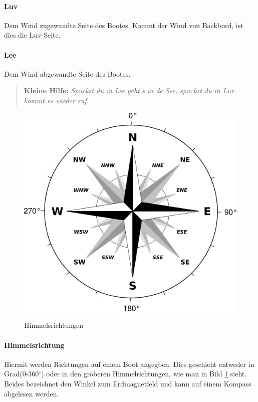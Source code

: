 \documentclass[12pt]{article}
\begin{document}
\paragraph{Luv}
Dem Wind zugewandte Seite des Bootes. Kommt der Wind von Backbord, ist dies die Luv-Seite.

\paragraph{Lee}
Dem Wind abgewandte Seite des Bootes.

\begin{quote}
\textbf{Kleine Hilfe:} \textit{Spuckst du in Lee geht's in de See, spuckst du in Luv kommt es wieder ruf.}
\end{quote}

\begin{figure}[h!]
\begin{center}
\label{himmelsrichtungen}
\includegraphics[scale=0.4]{bilder/windrose.pdf}
\end{center}
\caption{Himmelsrichtungen}
\end{figure}

\paragraph{Himmelsrichtung}
Hiermit werden Richtungen auf einem Boot angegben. Dies geschieht entweder in Grad(0-360$^\circ$) oder in den gröberen Himmelrichtungen, wie man in Bild \ref{himmelsrichtungen} sieht. Beides bezeichnet den Winkel zum Erdmagnetfeld und kann auf einem Kompass abgelesen werden.
\end{document}

